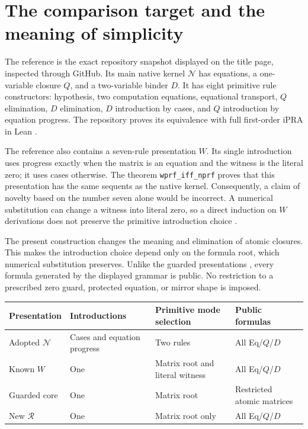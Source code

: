 \section{The comparison target and the meaning of simplicity}

The reference is the exact repository snapshot displayed on the title
page, inspected through GitHub. Its main native kernel $\mathcal N$
has equations, a one-variable closure $Q$, and a two-variable binder $D$.
It has eight primitive rule constructors: hypothesis, two computation
equations, equational transport, $Q$ elimination, $D$ elimination,
$D$ introduction by cases, and $Q$ introduction by equation progress.
The repository proves its equivalence with full first-order iPRA in Lean
\cite{baseline,native,bridge}.

The reference also contains a seven-rule presentation $W$.
Its single introduction uses progress exactly when the matrix is an
equation and the witness is the literal zero; it uses cases otherwise.
The theorem \texttt{wprf\_iff\_nprf} proves that this presentation has the
same sequents as the native kernel. Consequently, a claim of novelty
based on the number seven alone would be incorrect. A numerical
substitution can change a witness into literal zero, so a direct induction
on $W$ derivations does not preserve the primitive introduction choice
\cite{witness}.

The present construction changes the meaning and elimination of atomic
closures. This makes the introduction choice depend only on the formula
root, which numerical substitution preserves. Unlike the guarded
presentations \cite{guarded}, every formula generated by the displayed
grammar is public. No restriction to a prescribed zero guard, protected
equation, or mirror shape is imposed.

\begin{center}
\small
\begin{tabular}{@{}p{}p{}p{}p{}@{}}
\toprule
Presentation & Introductions & Primitive mode selection & Public formulas \\
\midrule
Adopted $\mathcal N$ & Cases and equation progress & Two rules & All Eq/$Q$/$D$ \\
Known $W$ & One & Matrix root and literal witness & All Eq/$Q$/$D$ \\
Guarded core & One & Matrix root & Restricted atomic matrices \\
New $\mathcal R$ & One & Matrix root only & All Eq/$Q$/$D$ \\
\bottomrule
\end{tabular}
\end{center}

